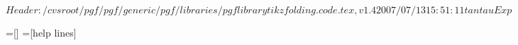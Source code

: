 %
%
%

\ProvidesFileRCS[v\pgfversion] $Header: /cvsroot/pgf/pgf/generic/pgf/libraries/pgflibrarytikzfolding.code.tex,v 1.4 2007/07/13 15:51:11 tantau Exp $


%
% 

\newdimen\tikz@lib@fold@length
\tikz@lib@fold@length=2cm


\def\tikz@lib@fold@pentagon#1#2#3#4#5#6{%
  \begin{scope}[xshift=.5\tikz@lib@fold@length,yshift=0.68819\tikz@lib@fold@length]
    #1
  \end{scope}
  \begin{scope}[shift={(108:\tikz@lib@fold@length)},shift={(36:\tikz@lib@fold@length)},rotate=-36]
    #2
  \end{scope}
  \begin{scope}[xshift=\tikz@lib@fold@length,shift={(72:\tikz@lib@fold@length)},rotate=-108]
    #3
  \end{scope}
  \begin{scope}[xshift=\tikz@lib@fold@length,rotate=180]
    #4
  \end{scope}
  \begin{scope}[rotate=108]
    #5
  \end{scope}
  \begin{scope}[shift={(108:\tikz@lib@fold@length)},rotate=36]
    #6
  \end{scope}
}


\def\tikz@lib@fold@path{\draw[every fold](0,0) -- (\tikz@lib@fold@length,0pt);}
\def\tikz@lib@fold@cut@path{\draw[every cut](0,0) -- (\tikz@lib@fold@length,0pt);}
\def\tikz@lib@fold@ear@path{
  \draw[every fold](0,0) -- (\tikz@lib@fold@length,0pt);
  \draw[every cut] (0,0) -- (.5\tikz@lib@fold@length,.2\tikz@lib@fold@length) --(\tikz@lib@fold@length,0pt);}

=[]
=[help lines]



